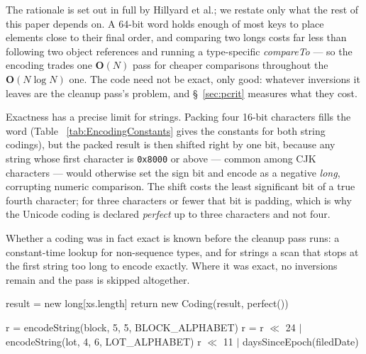 \documentclass[twoside,leqno,twocolumn]{article}
\begin{document}
The rationale is set out in full by Hillyard et al.\cite{huskysort2020}; we restate only what the rest of
this paper depends on.
A 64-bit word holds enough of most keys to place elements close to their final order, and comparing two
longs costs far less than following two object references and running a type-specific
\textit{compareTo} --- so the encoding trades one $\textbf{O}(N)$ pass for cheaper comparisons throughout
the $\textbf{O}(N \log N)$ one.
The code need not be exact, only good: whatever inversions it leaves are the cleanup pass's problem, and
\S~\ref{sec:pcrit} measures what they cost.

Exactness has a precise limit for strings.
Packing four 16-bit characters fills the word (Table ~\ref{tab:EncodingConstants} gives the constants for
both string codings), but the packed result is then shifted right by one bit, because any string whose
first character is \texttt{0x8000} or above --- common among CJK characters --- would otherwise set the
sign bit and encode as a negative \textit{long}, corrupting numeric comparison.
The shift costs the least significant bit of a true fourth character; for three characters or fewer that
bit is padding, which is why the Unicode coding is declared \textit{perfect} up to three characters and
not four.

Whether a coding was in fact exact is known before the cleanup pass runs: a constant-time lookup for
non-sequence types, and for strings a scan that stops at the first string too long to encode exactly.
Where it was exact, no inversions remain and the pass is skipped altogether.


\begin{algorithm2e}
 result = new long[xs.length]\;
 return new Coding(result, perfect())\;
 \caption{huskyEncode}
 \label{alg:the_alg2}
\end{algorithm2e}


\begin{algorithm2e}
 r = encodeString(block, 5, 5, BLOCK\_ALPHABET)\;
 r = r $\ll$ 24 $|$ encodeString(lot, 4, 6, LOT\_ALPHABET)\;
 \Return r $\ll$ 11 $|$ daysSinceEpoch(filedDate)\;
 \BlankLine
 \caption{A composite husky coder: \textit{PermitCoder}. \textit{encodeString} packs \textit{width}
   symbols of \textit{bits} each, right-padding with zero.}
 \label{alg:permitcoder}
\end{algorithm2e}
\end{document}
